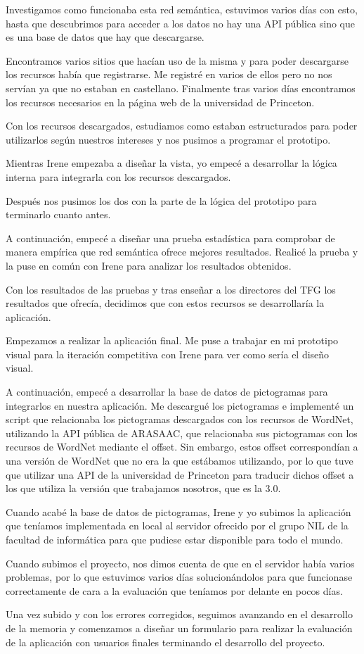 Investigamos como funcionaba esta red semántica, estuvimos varios días con esto, hasta que descubrimos para acceder a los datos no hay una API pública sino que es una base de datos que hay que descargarse.

Encontramos varios sitios que hacían uso de la misma y para poder descargarse los recursos había que registrarse. Me registré en varios de ellos pero no nos servían ya que no estaban en castellano. Finalmente tras varios días encontramos los recursos necesarios en la página web de la universidad de Princeton.

Con los recursos descargados, estudiamos como estaban estructurados para poder utilizarlos según nuestros intereses y nos pusimos a programar el prototipo.

Mientras Irene empezaba a diseñar la vista, yo empecé a desarrollar la lógica interna para integrarla con los recursos descargados.

Después nos pusimos los dos con la parte de la lógica del prototipo para terminarlo cuanto antes.

A continuación, empecé a diseñar una prueba estadística para comprobar de manera empírica que red semántica ofrece mejores resultados. Realicé la prueba y la puse en común con Irene para analizar los resultados obtenidos.

Con los resultados de las pruebas y tras enseñar a los directores del TFG los resultados que ofrecía, decidimos que con estos recursos se desarrollaría la aplicación. 

Empezamos a realizar la aplicación final. Me puse a trabajar en mi prototipo visual para la iteración competitiva con Irene para ver como sería el diseño visual.

A continuación, empecé a desarrollar la base de datos de pictogramas para integrarlos en nuestra aplicación. Me descargué los pictogramas e implementé un script que relacionaba los pictogramas descargados con los recursos de WordNet, utilizando la API pública de ARASAAC, que relacionaba sus pictogramas con los recursos de WordNet mediante el offset. Sin embargo, estos offset correspondían a una versión de WordNet que no era la que estábamos utilizando, por lo que tuve que utilizar una API de la universidad de Princeton para traducir dichos offset a los que utiliza la versión que trabajamos nosotros, que es la 3.0.

Cuando acabé la base de datos de pictogramas, Irene y yo subimos la aplicación que teníamos implementada en local al servidor ofrecido por el grupo NIL de la facultad de informática para que pudiese estar disponible para todo el mundo. 

Cuando subimos el proyecto, nos dimos cuenta de que en el servidor había varios problemas, por lo que estuvimos varios días solucionándolos para que funcionase correctamente de cara a la evaluación que teníamos por delante en pocos días.


Una vez subido y con los errores corregidos, seguimos avanzando en el desarrollo de la memoria y comenzamos a diseñar un formulario para realizar la evaluación de la aplicación con usuarios finales terminando el desarrollo del proyecto.




